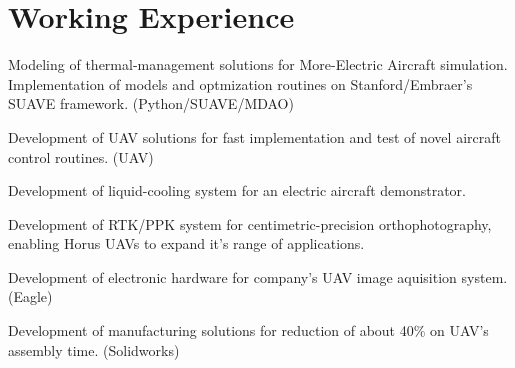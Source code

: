 \documentclass[A4]{deedy-resume} %
\begin{document}
\begin{minipage}[t]{0.67\textwidth} %



\section{Working Experience}

\vspace{\topsep} %
\begin{tightitemize}
 \item Modeling of thermal-management solutions for More-Electric Aircraft simulation. Implementation of models and optmization routines on Stanford/Embraer's SUAVE framework. (Python/SUAVE/MDAO)
 \item Development of UAV solutions for fast implementation and test of novel aircraft control routines. (UAV)
 \item Development of liquid-cooling system for an electric aircraft demonstrator.
\end{tightitemize}
\sectionspace %

\vspace{\topsep} %
\begin{tightitemize}
 \item Development of RTK/PPK system for centimetric-precision orthophotography, enabling Horus UAVs to expand it's range of applications.
 \item Development of electronic hardware for company's UAV image aquisition system. (Eagle)
 \item Development of manufacturing solutions for reduction of about 40\% on UAV's assembly time. (Solidworks)
\end{tightitemize}
\sectionspace %


\end{minipage}
\end{document}

